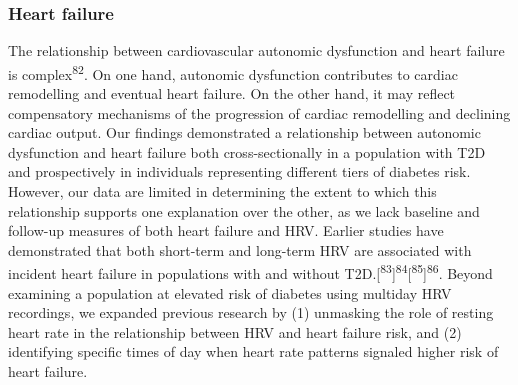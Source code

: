 \documentclass[
  a4paper,
  headsepline=true,
  open=any]{scrbook}
\begin{document}
\hypertarget{heart-failure-1}{%
\subsubsection{Heart failure}\label{heart-failure-1}}

The relationship between cardiovascular autonomic dysfunction and heart
failure is complex\textsuperscript{82}. On one hand, autonomic
dysfunction contributes to cardiac remodelling and eventual heart
failure. On the other hand, it may reflect compensatory mechanisms of
the progression of cardiac remodelling and declining cardiac output. Our
findings demonstrated a relationship between autonomic dysfunction and
heart failure both cross-sectionally in a population with T2D and
prospectively in individuals representing different tiers of diabetes
risk. However, our data are limited in determining the extent to which
this relationship supports one explanation over the other, as we lack
baseline and follow-up measures of both heart failure and HRV. Earlier
studies have demonstrated that both short-term and long-term HRV are
associated with incident heart failure in populations with and without
T2D.{[}\textsuperscript{83}{]}\textsuperscript{84}{[}\textsuperscript{85}{]}\textsuperscript{86}.
Beyond examining a population at elevated risk of diabetes using
multiday HRV recordings, we expanded previous research by (1) unmasking
the role of resting heart rate in the relationship between HRV and heart
failure risk, and (2) identifying specific times of day when heart rate
patterns signaled higher risk of heart failure.
\end{document}
